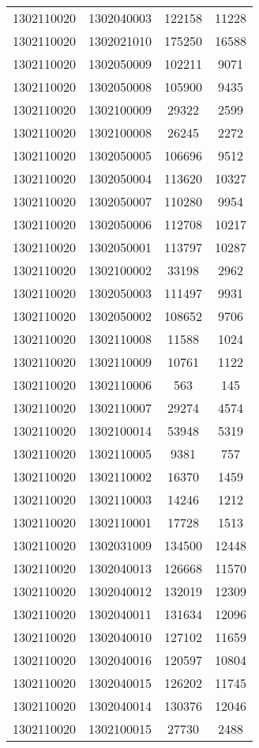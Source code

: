 \begin{longtable}{llcc}
1302110020 & 1302040003 & 122158 & 11228\\
1302110020 & 1302021010 & 175250 & 16588\\
1302110020 & 1302050009 & 102211 & 9071\\
1302110020 & 1302050008 & 105900 & 9435\\
1302110020 & 1302100009 & 29322 & 2599\\
1302110020 & 1302100008 & 26245 & 2272\\
1302110020 & 1302050005 & 106696 & 9512\\
1302110020 & 1302050004 & 113620 & 10327\\
1302110020 & 1302050007 & 110280 & 9954\\
1302110020 & 1302050006 & 112708 & 10217\\
1302110020 & 1302050001 & 113797 & 10287\\
1302110020 & 1302100002 & 33198 & 2962\\
1302110020 & 1302050003 & 111497 & 9931\\
1302110020 & 1302050002 & 108652 & 9706\\
1302110020 & 1302110008 & 11588 & 1024\\
1302110020 & 1302110009 & 10761 & 1122\\
1302110020 & 1302110006 & 563 & 145\\
1302110020 & 1302110007 & 29274 & 4574\\
1302110020 & 1302100014 & 53948 & 5319\\
1302110020 & 1302110005 & 9381 & 757\\
1302110020 & 1302110002 & 16370 & 1459\\
1302110020 & 1302110003 & 14246 & 1212\\
1302110020 & 1302110001 & 17728 & 1513\\
1302110020 & 1302031009 & 134500 & 12448\\
1302110020 & 1302040013 & 126668 & 11570\\
1302110020 & 1302040012 & 132019 & 12309\\
1302110020 & 1302040011 & 131634 & 12096\\
1302110020 & 1302040010 & 127102 & 11659\\
1302110020 & 1302040016 & 120597 & 10804\\
1302110020 & 1302040015 & 126202 & 11745\\
1302110020 & 1302040014 & 130376 & 12046\\
1302110020 & 1302100015 & 27730 & 2488\\

\end{longtable}
